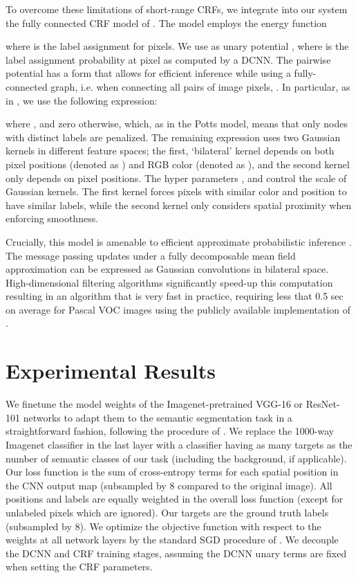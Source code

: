 \documentclass[10pt,journal,compsoc]{IEEEtran}
\begin{document}
To overcome these limitations of short-range CRFs, we integrate into our system
the fully connected CRF model of \cite{krahenbuhl2011efficient}. The model
employs the energy function

where  is the label assignment for pixels. We use as unary
potential , where  is the label
assignment probability at pixel  as computed by a DCNN. The pairwise
potential has a form that allows for efficient inference while using a fully-connected graph, i.e.
when  connecting 
all pairs of image pixels, . In particular, as in \cite{krahenbuhl2011efficient},  we use the following expression:

where
, and zero otherwise, which, as in the Potts model, means that only nodes with distinct labels are penalized.  The remaining expression uses two Gaussian kernels in different feature spaces; the first, `bilateral' kernel
depends on both pixel positions (denoted as ) and
RGB color (denoted as ), and the second kernel only depends on pixel
positions. The hyper parameters ,  and
 control the scale of Gaussian kernels. The  first kernel forces pixels with similar color and position to have similar labels, while the second kernel only considers spatial proximity when enforcing smoothness. 



Crucially, this model is amenable to efficient approximate probabilistic
inference \cite{krahenbuhl2011efficient}. The message passing updates under a
fully decomposable mean field approximation  can be expressed as Gaussian convolutions in bilateral
space. High-dimensional filtering algorithms \cite{adams2010fast}
significantly speed-up this computation resulting in an algorithm that is very
fast in practice, requiring less that 0.5 sec on average for Pascal VOC images using the
publicly available implementation of \cite{krahenbuhl2011efficient}.
 \section{Experimental Results}
\label{sec:experiments}

We finetune the model weights of the Imagenet-pretrained VGG-16 or ResNet-101
networks to adapt them to the semantic segmentation task in a straightforward
fashion, following the procedure of \cite{long2014fully}. We replace the
1000-way Imagenet classifier in the last layer with a classifier having as many
targets as the number of semantic classes of our task (including the background,
if applicable). Our loss function is the sum of cross-entropy terms for each
spatial position in the CNN output map (subsampled by 8 compared to the original
image). All positions and labels are equally weighted in the overall loss
function (except for unlabeled pixels which are ignored). Our targets are the
ground truth labels (subsampled by 8). We optimize the objective function with
respect to the weights at all network layers by the standard SGD procedure of
\cite{KrizhevskyNIPS2013}. We decouple the DCNN and CRF training stages,
assuming the DCNN unary terms are fixed when setting the CRF parameters.
\end{document}
